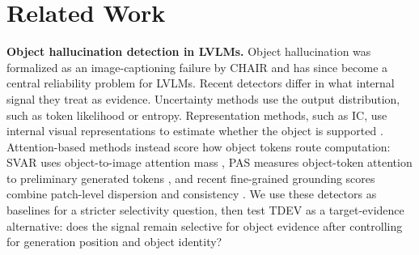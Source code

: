 \section{Related Work}
\label{sec:related}

\noindent\textbf{Object hallucination detection in LVLMs.}
Object hallucination was formalized as an image-captioning failure by CHAIR \cite{rohrbach2018chair} and has since become a central reliability problem for LVLMs. Recent detectors differ in what internal signal they treat as evidence. Uncertainty methods use the output distribution, such as token likelihood or entropy. Representation methods, such as IC, use internal visual representations to estimate whether the object is supported \cite{jiang2024interpreting}. Attention-based methods instead score how object tokens route computation: SVAR uses object-to-image attention mass \cite{jiang2024devils}, PAS measures object-token attention to preliminary generated tokens \cite{hoangxuan2026pas}, and recent fine-grained grounding scores combine patch-level dispersion and consistency \cite{beyond2026global}. We use these detectors as baselines for a stricter selectivity question, then test TDEV as a target-evidence alternative: does the signal remain selective for object evidence after controlling for generation position and object identity?

